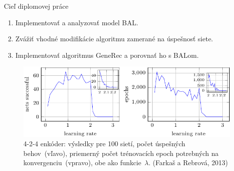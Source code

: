 \documentclass[xcolor=dvipsnames]{beamer}
\begin{document}
\begin{frame}{Cieľ diplomovej práce} 
  \begin{enumerate} 
    \item Implementovať a analyzovať model BAL. 
    \item Zvážiť vhodné modifikácie algoritmu zamerané na úspešnosť siete. 
    \item Implementovať algoritmus GeneRec a porovnať ho s BALom. 
  \end{enumerate} 
  
  \begin{figure}[h!]  
    \centering
    \includegraphics[scale=0.40]{img/bal_performance.png}
    \caption{\small 4-2-4 enkóder: výsledky pre 100 sietí, počet úspešných behov~(vľavo), priemerný počet trénovacích epoch potrebných na konvergenciu~(vpravo), obe ako funkcie~$\lambda$. (Farkaš a Rebrová, 2013)} 
  \end{figure}  
  
\end{frame} 

\end{document}
